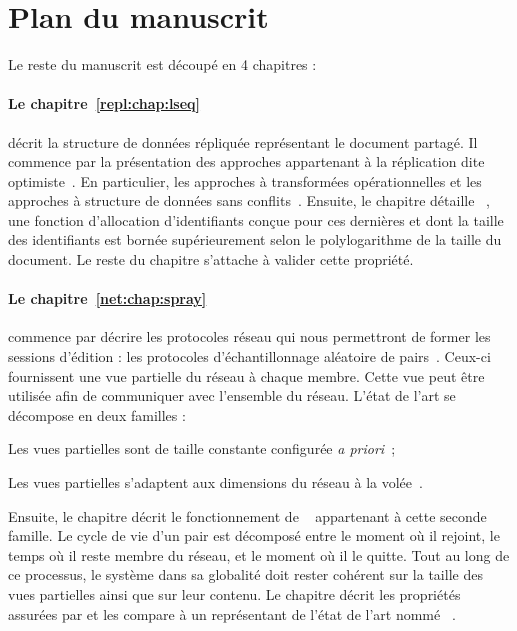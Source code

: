 
\section{Plan du manuscrit}

Le reste du manuscrit est découpé en 4 chapitres :

\paragraph{Le chapitre~\ref{repl:chap:lseq}} décrit la structure de données
répliquée représentant le document partagé. Il commence par la présentation des
approches appartenant à la réplication dite optimiste~\cite{demers1987epidemic,
  saito2005optimistic}. En particulier, les approches à transformées
opérationnelles et les approches à structure de données sans
conflits~\cite{burckhardt2014replicated, shapiro2011conflict}. Ensuite, le
chapitre détaille \LSEQ~\cite{nedelec2013concurrency, nedelec2013lseq}, une
fonction d'allocation d'identifiants conçue pour ces dernières et dont la taille
des identifiants est bornée supérieurement selon le polylogarithme de la taille
du document. Le reste du chapitre s'attache à valider cette propriété.

\paragraph{Le chapitre~\ref{net:chap:spray}} commence par décrire les
protocoles réseau qui nous permettront de former les sessions d'édition : les
protocoles d'échantillonnage aléatoire de pairs~\cite{jelasity2004peer,
  jelasity2007gossip}. Ceux-ci fournissent une vue partielle du réseau à chaque
membre. Cette vue peut être utilisée afin de communiquer avec l'ensemble du
réseau. L'état de l'art se décompose en deux familles :
\begin{inparaenum}[(i)]
\item Les vues partielles sont de taille constante configurée \emph{a
    priori}~\cite{eugster2003lightweight, jelasity2007gossip,
    leitao2007dependable, tolgyeski2009adaptive, voulgaris2005cyclon};
\item Les vues partielles s'adaptent aux dimensions du réseau à la
  volée~\cite{ganesh2001scamp, ganesh2003peer}.
\end{inparaenum}
Ensuite, le chapitre décrit le fonctionnement de \SPRAY~\cite{nedelec2015spray}
appartenant à cette seconde famille. Le cycle de vie d'un pair est décomposé
entre le moment où il rejoint, le temps où il reste membre du réseau, et le
moment où il le quitte. Tout au long de ce processus, le système dans sa
globalité doit rester cohérent sur la taille des vues partielles ainsi que sur
leur contenu.  Le chapitre décrit les propriétés assurées par \SPRAY et les
compare à un représentant de l'état de l'art nommé
\CYCLON~\cite{voulgaris2005cyclon}.

